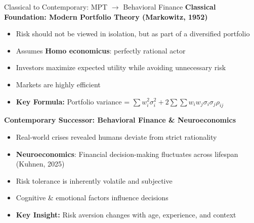 \documentclass[aspectratio=169,10pt]{beamer}
\renewcommand{\small}{\fontsize{7pt}{8.5pt}\selectfont}
\renewcommand{\large}{\fontsize{9pt}{11pt}\selectfont}
\newcommand{\question}[1]{{\large\bfseries\color{crimson}#1}}
\begin{document}
	
	
	\begin{frame}{Classical to Contemporary: MPT $\rightarrow$ Behavioral Finance}
		\question{Classical Foundation: Modern Portfolio Theory (Markowitz, 1952)}
		\small
		\begin{itemize}
			\item Risk should not be viewed in isolation, but as part of a diversified portfolio
			\item Assumes \textbf{Homo economicus}: perfectly rational actor
			\item Investors maximize expected utility while avoiding unnecessary risk
			\item Markets are highly efficient
			\item \textbf{Key Formula:} Portfolio variance = $\sum w_i^2\sigma_i^2 + 2\sum\sum w_iw_j\sigma_i\sigma_j\rho_{ij}$
		\end{itemize}
		
		\vspace{0.1cm}
		\question{Contemporary Successor: Behavioral Finance \& Neuroeconomics}
		\small
		\begin{itemize}
			\item Real-world crises revealed humans deviate from strict rationality
			\item \textbf{Neuroeconomics}: Financial decision-making fluctuates across lifespan (Kuhnen, 2025)
			\item Risk tolerance is inherently volatile and subjective
			\item Cognitive \& emotional factors influence decisions
			\item \textbf{Key Insight:} Risk aversion changes with age, experience, and context
		\end{itemize}
	\end{frame}
	
	
\end{document}
